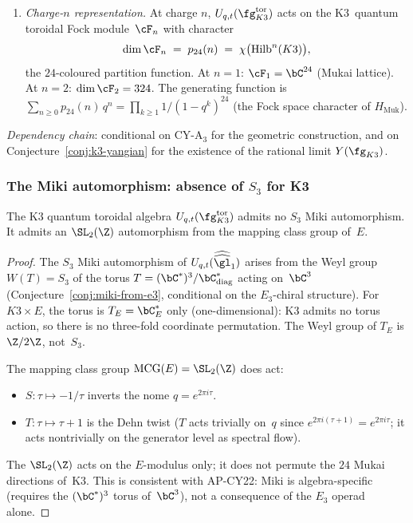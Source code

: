 \begin{conjecture}
\begin{enumerate}[label=\textup{(\roman*)}]
\item \emph{Charge-$n$ representation.}
At charge $n$, $U_{q,t}(\fg_{K3}^{\mathrm{tor}})$ acts on the
K3~quantum toroidal Fock module~$\cF_n$ with character
\[
  \dim \cF_n \;=\; p_{24}(n)
  \;=\; \chi\bigl(\mathrm{Hilb}^n(K3)\bigr),
\]
the $24$-coloured partition function.
At $n = 1$: $\cF_1 = \bC^{24}$ (Mukai lattice).
At $n = 2$: $\dim \cF_2 = 324$.
The generating function is
$\sum_{n \geq 0} p_{24}(n)\, q^n
= \prod_{k \geq 1} 1/(1 - q^k)^{24}$
(the Fock space character of $H_{\mathrm{Muk}}$).
\end{enumerate}
\emph{Dependency chain}: conditional on CY-A$_3$ for the
geometric construction, and on Conjecture~\ref{conj:k3-yangian}
for the existence of the rational limit $Y(\fg_{K3})$.
\end{conjecture}

\subsubsection{The Miki automorphism: absence of $S_3$ for K3}

\begin{proposition}
\label{prop:k3-qt-no-s3-miki}
\ClaimStatusProvedHere
The K3 quantum toroidal algebra $U_{q,t}(\fg_{K3}^{\mathrm{tor}})$
admits no $S_3$ Miki automorphism.
It admits an $\SL_2(\Z)$ automorphism from the mapping class group
of~$E$.
\end{proposition}

\begin{proof}
The $S_3$ Miki automorphism of $U_{q,t}(\widehat{\widehat{\gl}}_1)$
arises from the Weyl group $W(T) = S_3$ of the torus
$T = (\bC^*)^3/\bC^*_{\mathrm{diag}}$ acting on~$\bC^3$
(Conjecture~\ref{conj:miki-from-e3}, conditional on the
$E_3$-chiral structure).
For $K3 \times E$, the torus is $T_E = \bC^*_E$ only
(one-dimensional): K3 admits no torus action, so there is no
three-fold coordinate permutation.
The Weyl group of $T_E$ is $\Z/2\Z$, not~$S_3$.

The mapping class group $\mathrm{MCG}(E) = \SL_2(\Z)$ does act:
\begin{itemize}
  \item $S \colon \tau \mapsto -1/\tau$ inverts the nome
    $q = e^{2\pi i \tau}$.
  \item $T \colon \tau \mapsto \tau + 1$ is the Dehn twist
    ($T$ acts trivially on~$q$ since $e^{2\pi i(\tau+1)} = e^{2\pi i \tau}$;
    it acts nontrivially on the generator level as spectral flow).
\end{itemize}
The $\SL_2(\Z)$ acts on the $E$-modulus only; it does not
permute the $24$ Mukai directions of~K3.
This is consistent with AP-CY22: Miki is algebra-specific
(requires the $(\bC^*)^3$ torus of~$\bC^3$), not a consequence
of the $E_3$ operad alone.
\end{proof}

